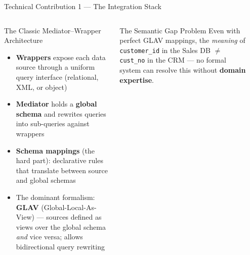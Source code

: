 \documentclass[aspectratio=169,10pt]{beamer}
\begin{document}
\begin{frame}{Technical Contribution 1 — The Integration Stack}
  \begin{columns}[T]
      \begin{block}{The Classic Mediator–Wrapper Architecture}
        \begin{itemize}
          \item \textbf{Wrappers} expose each data source through a
                uniform query interface (relational, XML, or object)
          \item \textbf{Mediator} holds a \textbf{global schema} and
                rewrites queries into sub-queries against wrappers
          \item \textbf{Schema mappings} (the hard part): declarative
                rules that translate between source and global schemas
          \item The dominant formalism: \textbf{GLAV} (Global-Local-As-View)
                — sources defined as views over the global schema
                \emph{and} vice versa; allows bidirectional query rewriting
        \end{itemize}
      \end{block}
      \vspace{5pt}
      \begin{alertblock}{The Semantic Gap Problem}
        Even with perfect GLAV mappings, the \emph{meaning} of
        \texttt{customer\_id} in the Sales DB $\neq$
        \texttt{cust\_no} in the CRM — no formal system can resolve
        this without \textbf{domain expertise}.
      \end{alertblock}

      \begin{center}
\end{center}
\end{columns}
\end{frame}
\end{document}
